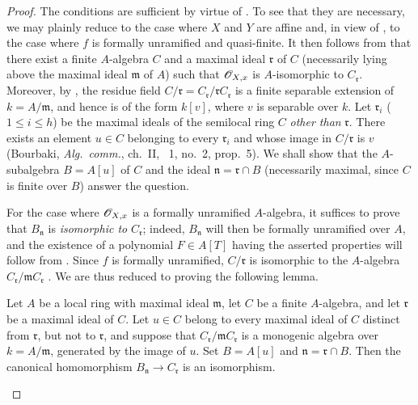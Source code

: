 \begin{proof}
The conditions are sufficient by virtue of .
To see that they are necessary, we may plainly reduce to the case where $X$ and $Y$ are affine and, in view of , to the case where $f$ is formally unramified and quasi-finite.
It then follows from  that there exist a finite $A$-algebra $C$ and a maximal ideal $\mathfrak{r}$ of $C$ (necessarily lying above the maximal ideal $\mathfrak{m}$ of $A$) such that $\mathscr{O}_{X,x}$ is $A$-isomorphic to $C_\mathfrak{r}$.
Moreover, by , the residue field $C/\mathfrak{r}=C_\mathfrak{r}/\mathfrak{r}C_\mathfrak{r}$ is a finite separable extension of $k=A/\mathfrak{m}$, and hence is of the form $k[v]$, where $v$ is separable over $k$.
Let $\mathfrak{r}_i$ ($1\leq i\leq h$) be the maximal ideals of the semilocal ring $C$ \emph{other than} $\mathfrak{r}$.
There exists an element $u\in C$ belonging to every $\mathfrak{r}_i$ and whose image in $C/\mathfrak{r}$ is $v$ (Bourbaki, \emph{Alg.\ comm.}, ch.~II, \textsection~1, no.~2, prop.~5).
We shall show that the $A$-subalgebra $B=A[u]$ of $C$ and the ideal $\mathfrak{n}=\mathfrak{r}\cap B$ (necessarily maximal, since $C$ is finite over $B$) answer the question.

For the case where $\mathscr{O}_{X,x}$ is a formally unramified $A$-algebra, it suffices to prove that $B_\mathfrak{n}$ is \emph{isomorphic to} $C_\mathfrak{r}$; indeed, $B_\mathfrak{n}$ will then be formally unramified over $A$, and the existence of a polynomial $F\in A[T]$ having the asserted properties will follow from .
Since $f$ is formally unramified, $C/\mathfrak{r}$ is isomorphic to the $A$-algebra $C_\mathfrak{r}/\mathfrak{m}C_\mathfrak{r}$ .
We are thus reduced to proving the following lemma.

\begin{lemma}[18.4.6.1]
\label{IV.18.4.6.1}
Let $A$ be a local ring with maximal ideal $\mathfrak{m}$, let $C$ be a finite $A$-algebra, and let $\mathfrak{r}$ be a maximal ideal of $C$.
Let $u\in C$ belong to every maximal ideal of $C$ distinct from $\mathfrak{r}$, but not to $\mathfrak{r}$, and suppose that $C_\mathfrak{r}/\mathfrak{m}C_\mathfrak{r}$ is a monogenic algebra over $k=A/\mathfrak{m}$, generated by the image of $u$.
Set $B=A[u]$ and $\mathfrak{n}=\mathfrak{r}\cap B$.
Then the canonical homomorphism $B_\mathfrak{n}\to C_\mathfrak{r}$ is an isomorphism.
\end{lemma}


\end{proof}
